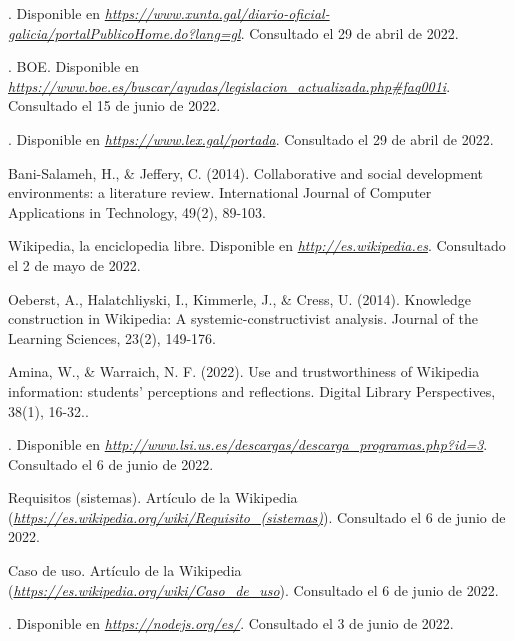 

\begin{thebibliography}{99}

. Disponible en {\it \url{https://www.xunta.gal/diario-oficial-galicia/portalPublicoHome.do?lang=gl}}. Consultado el 29 de abril de 2022.

. BOE. Disponible en {\it \url{https://www.boe.es/buscar/ayudas/legislacion_actualizada.php#faq001i}}. Consultado el 15 de junio de 2022.

. Disponible en {\it \url{https://www.lex.gal/portada}}. Consultado el 29 de abril de 2022.

 Bani-Salameh, H., \& Jeffery, C. (2014). Collaborative and social development environments: a literature review. International Journal of Computer Applications in Technology, 49(2), 89-103.

 Wikipedia, la enciclopedia libre. Disponible en {\it \url{http://es.wikipedia.es}}. Consultado el 2 de mayo de 2022.

 Oeberst, A., Halatchliyski, I., Kimmerle, J., \& Cress, U. (2014). Knowledge construction in Wikipedia: A systemic-constructivist analysis. Journal of the Learning Sciences, 23(2), 149-176.

 Amina, W., \& Warraich, N. F. (2022). Use and trustworthiness of Wikipedia information: students’ perceptions and reflections. Digital Library Perspectives, 38(1), 16-32..

. Disponible en {\it \url{http://www.lsi.us.es/descargas/descarga_programas.php?id=3}}. Consultado el 6 de junio de 2022.

 Requisitos (sistemas). Artículo de la Wikipedia ({\it \url{https://es.wikipedia.org/wiki/Requisito_(sistemas)}}). Consultado el 6 de junio de 2022.

 Caso de uso. Artículo de la Wikipedia ({\it \url{https://es.wikipedia.org/wiki/Caso_de_uso}}). Consultado el 6 de junio de 2022.

. Disponible en {\it \url{https://nodejs.org/es/}}. Consultado el 3 de junio de 2022.


\end{thebibliography}
